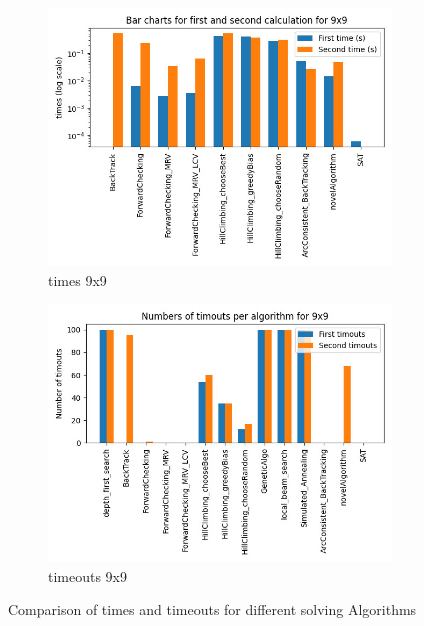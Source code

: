 \begin{figure}[h!]
    \centering

    \begin{subfigure}[b]{0.8\textwidth}
        \includegraphics[width=\textwidth]{Pictures/times_9x9}
        \caption{times 9x9}
    \end{subfigure}
    \hfill
    \begin{subfigure}[b]{0.8\textwidth}
        \includegraphics[width=\linewidth]{Pictures/timeouts_9x9}
        \caption{timeouts 9x9}
    \end{subfigure}

    \caption{Comparison of times and timeouts for different solving Algorithms}
    \label{fig:sat_csp_comparison}
\end{figure}

